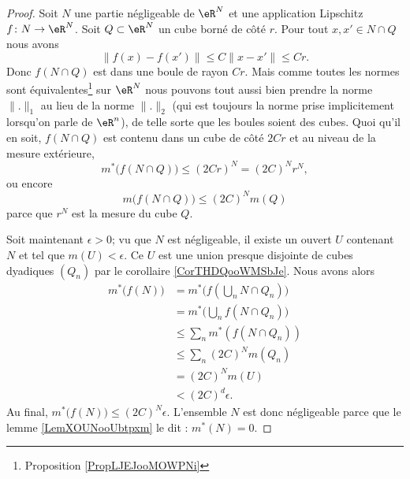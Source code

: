\begin{proof}
    Soit \( N\) une partie négligeable de \( \eR^N\) et une application Lipschitz \( f\colon N\to \eR^N\). Soit \( Q\subset \eR^N\) un cube borné de côté \( r\). Pour tout \( x,x'\in N\cap Q\) nous avons
    \begin{equation}
        \| f(x)-f(x') \|\leq C\| x-x' \|\leq Cr.
    \end{equation}
    Donc \( f(N\cap Q)\) est dans une boule de rayon \( Cr\). Mais comme toutes les normes sont équivalentes\footnote{Proposition \ref{PropLJEJooMOWPNi}} sur \( \eR^N\) nous pouvons tout aussi bien prendre la norme \( \| . \|_1\) au lieu de la norme \( \| . \|_2\) (qui est toujours la norme prise implicitement lorsqu'on parle de \( \eR^n\)), de telle sorte que les boules soient des cubes. Quoi qu'il en soit, \( f(N\cap Q)\) est contenu dans un cube de côté \( 2Cr\) et au niveau de la mesure extérieure,
    \begin{equation}
        m^*\big( f(N\cap Q) \big)\leq (2Cr)^N=(2C)^Nr^N,
    \end{equation}
    ou encore
    \begin{equation}
        m\big(f(N\cap Q)\big)\leq (2C)^Nm(Q)
    \end{equation}
    parce que \( r^N\) est la mesure du cube \( Q\).

    Soit maintenant \( \epsilon>0\); vu que \( N\) est négligeable, il existe un ouvert \( U\) contenant \( N\) et tel que \( m(U)<\epsilon\). Ce \( U\) est une union presque disjointe de cubes dyadiques \( (Q_n)\) par le corollaire \ref{CorTHDQooWMSbJe}. Nous avons alors
    \begin{subequations}
        \begin{align}
            m^*\big( f(N) \big)&=m^*\big( f(\bigcup_nN\cap Q_n) \big)\\
            &=m^*\big( \bigcup_nf(N\cap Q_n) \big)\\
            &\leq \sum_nm^*(f(N\cap Q_n))\\
            &\leq \sum_n(2C)^Nm(Q_n)\\
            &=(2C)^Nm(U)\\
            &<(2C)^d\epsilon.
        \end{align}
    \end{subequations}
    Au final, \( m^*\big( f(N) \big)\leq (2C)^N\epsilon\).  L'ensemble \( N\) est donc négligeable parce que le lemme \ref{LemXOUNooUbtpxm} le dit : \( m^*(N)=0\).
\end{proof} 

